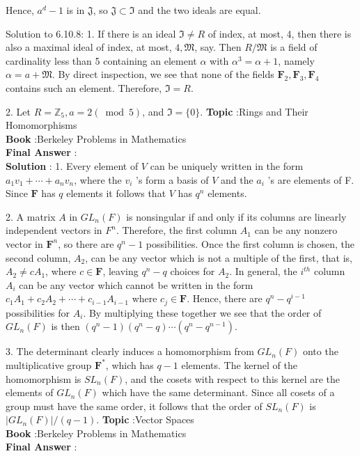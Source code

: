 \documentclass[10pt]{article}
\begin{document}
Hence, $a^{d}-1$ is in $\mathfrak{J}$, so $\mathfrak{J} \subset \mathfrak{I}$ and the two ideals are equal.

Solution to 6.10.8: 1. If there is an ideal $\mathfrak{I} \neq R$ of index, at most, 4, then there is also a maximal ideal of index, at most, $4, \mathfrak{M}$, say. Then $R / \mathfrak{M}$ is a field of cardinality less than 5 containing an element $\alpha$ with $\alpha^{3}=\alpha+1$, namely $\alpha=a+\mathfrak{M}$. By direct inspection, we see that none of the fields $\mathbf{F}_{2}, \mathbf{F}_{3}, \mathbf{F}_{4}$ contains such an element. Therefore, $\mathfrak{I}=R$.

2. Let $R=\mathbb{Z}_{5}, a=2(\bmod 5)$, and $\mathfrak{I}=\{0\}$.
\textbf{Topic} :Rings and Their Homomorphisms \\
\textbf{Book} :Berkeley Problems in Mathematics\\
\textbf{Final Answer} :\\


\textbf{Solution} : 1. Every element of $V$ can be uniquely written in the form $a_{1} v_{1}+\cdots+a_{n} v_{n}$, where the $v_{i}$ 's form a basis of $V$ and the $a_{i}$ 's are elements of F. Since $\mathbf{F}$ has $q$ elements it follows that $V$ has $q^{n}$ elements.

2. A matrix $A$ in $G L_{n}(F)$ is nonsingular if and only if its columns are linearly independent vectors in $F^{n}$. Therefore, the first column $A_{1}$ can be any nonzero vector in $\mathbf{F}^{n}$, so there are $q^{n}-1$ possibilities. Once the first column is chosen, the second column, $A_{2}$, can be any vector which is not a multiple of the first, that is, $A_{2} \neq c A_{1}$, where $c \in \mathbf{F}$, leaving $q^{n}-q$ choices for $A_{2}$. In general, the $i^{t h}$ column $A_{i}$ can be any vector which cannot be written in the form $c_{1} A_{1}+c_{2} A_{2}+\cdots+c_{i-1} A_{i-1}$ where $c_{j} \in \mathbf{F}$. Hence, there are $q^{n}-q^{i-1}$ possibilities for $A_{i}$. By multiplying these together we see that the order of $G L_{n}(F)$ is then $\left(q^{n}-1\right)\left(q^{n}-q\right) \cdots\left(q^{n}-q^{n-1}\right)$.

3. The determinant clearly induces a homomorphism from $G L_{n}(F)$ onto the multiplicative group $\mathbf{F}^{*}$, which has $q-1$ elements. The kernel of the homomorphism is $S L_{n}(F)$, and the cosets with respect to this kernel are the elements of $G L_{n}(F)$ which have the same determinant. Since all cosets of a group must have the same order, it follows that the order of $S L_{n}(F)$ is $\left|G L_{n}(F)\right| /(q-1)$.
\textbf{Topic} :Vector Spaces \\
\textbf{Book} :Berkeley Problems in Mathematics\\
\textbf{Final Answer} :\\
\end{document}
